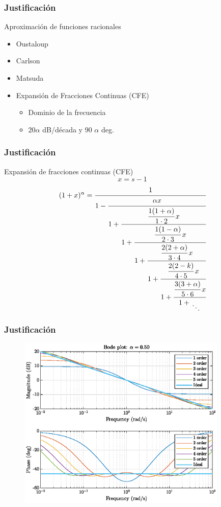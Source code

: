 \documentclass[10pt]{beamer}
\begin{document}
	\begin{frame}
		\frametitle{Justificación}
		\begin{block}{Aproximación de funciones racionales}
			\begin{itemize}
				\item {\color{blue} Oustaloup} \cite{Gunay2017}
				\item  Carlson
				\item Matsuda
				\item {\color{red}Expansión de Fracciones Continuas (CFE)}
				\begin{itemize}
					\item Dominio de la frecuencia
					\item $20\alpha$ dB/década y 90 $\alpha$ deg.
				\end{itemize}
			\end{itemize}
		\end{block}
	\end{frame}
	
	\begin{frame}
		\frametitle{Justificación}
		\begin{block}{Expansión de fracciones continuas (CFE)}
			\begin{equation}
				x = s-1
			\end{equation}
			\begin{equation}
 		(1 + x)^{\alpha} = \cfrac{1}{1 - \cfrac{\alpha x}{1 + \cfrac{\cfrac{1(1 + \alpha)}{1\cdot2}\,x}{1 + \cfrac{\cfrac{1(1 - \alpha)}{2\cdot3}\,x}{1 + \cfrac{\cfrac{2(2 + \alpha)}{3\cdot4}\,x}{1 + \cfrac{\cfrac{2(2 - k)}{4\cdot5}\,x}{1 + \cfrac{\cfrac{3(3 + \alpha)}{5\cdot6}\,x}{1 + \genfrac{}{}{0pt}{0}{}{\ddots}}}}}}}}
		 	\label{ec:lagrange}
			\end{equation}			
		\end{block}
	\end{frame}
	
	\begin{frame}
		\frametitle{Justificación}
		\begin{figure}[hbtp]
			\centering
			\includegraphics[width = 10cm]{A5_bode.eps}
		\end{figure}
	\end{frame}
	
\end{document}
